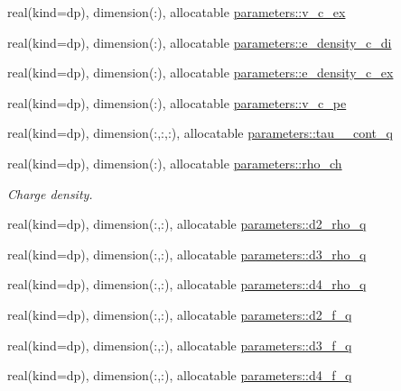 \begin{DoxyCompactItemize}
\item 
real(kind=dp), dimension(\+:), allocatable \mbox{\hyperlink{group__OTHER__DENSITIES_ga9fa9512dcae76285fafca5bf94f6d548}{parameters\+::v\+\_\+c\+\_\+ex}}
\item 
real(kind=dp), dimension(\+:), allocatable \mbox{\hyperlink{group__OTHER__DENSITIES_ga87dbb79a5a923879327d170ac2dd0554}{parameters\+::e\+\_\+density\+\_\+c\+\_\+di}}
\item 
real(kind=dp), dimension(\+:), allocatable \mbox{\hyperlink{group__OTHER__DENSITIES_gae0cdcff4839ee5f5e753521c6110a58c}{parameters\+::e\+\_\+density\+\_\+c\+\_\+ex}}
\item 
real(kind=dp), dimension(\+:), allocatable \mbox{\hyperlink{group__OTHER__DENSITIES_ga2ace64338ba159caa9b44094efffa81d}{parameters\+::v\+\_\+c\+\_\+pe}}
\item 
real(kind=dp), dimension(\+:,\+:,\+:), allocatable \mbox{\hyperlink{group__OTHER__DENSITIES_gae767b94dc83914662f299fc87eeaf623}{parameters\+::tau\+\_\+\_\+cont\+\_\+q}}
\item 
real(kind=dp), dimension(\+:), allocatable \mbox{\hyperlink{group__OTHER__DENSITIES_ga06ab0886762c00b75dd1adf55f9e61a0}{parameters\+::rho\+\_\+ch}}
\begin{DoxyCompactList}\small\item\em Charge density. \end{DoxyCompactList}\item 
real(kind=dp), dimension(\+:,\+:), allocatable \mbox{\hyperlink{namespaceparameters_a0234a871e1ff1d0be38099df82c5e698}{parameters\+::d2\+\_\+rho\+\_\+q}}
\item 
real(kind=dp), dimension(\+:,\+:), allocatable \mbox{\hyperlink{namespaceparameters_a1621c80d10f0cca4fec0e20ffbdda0f5}{parameters\+::d3\+\_\+rho\+\_\+q}}
\item 
real(kind=dp), dimension(\+:,\+:), allocatable \mbox{\hyperlink{namespaceparameters_a59deaa51eaa68f574d57f364fff6c77a}{parameters\+::d4\+\_\+rho\+\_\+q}}
\item 
real(kind=dp), dimension(\+:,\+:), allocatable \mbox{\hyperlink{namespaceparameters_a4e57ed84b90c4ca5998a9cdaa8ccb2da}{parameters\+::d2\+\_\+f\+\_\+q}}
\item 
real(kind=dp), dimension(\+:,\+:), allocatable \mbox{\hyperlink{namespaceparameters_ada2cda17d0e9bccb3581a5b22a05f876}{parameters\+::d3\+\_\+f\+\_\+q}}
\item 
real(kind=dp), dimension(\+:,\+:), allocatable \mbox{\hyperlink{namespaceparameters_af226839e94cc06ff5d33f92af38a014c}{parameters\+::d4\+\_\+f\+\_\+q}}

\end{DoxyCompactItemize}
